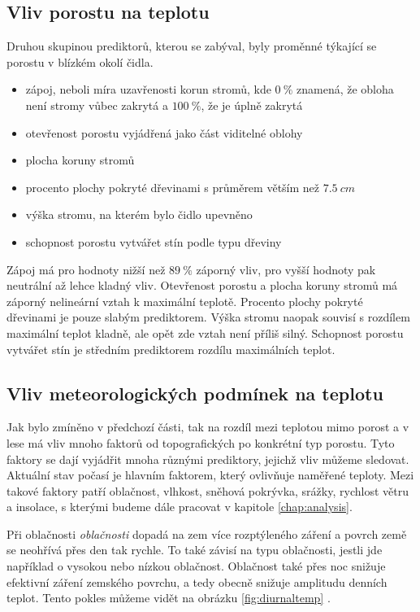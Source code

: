 \subsection{Vliv porostu na teplotu}
Druhou skupinou prediktorů, kterou se \parencite{ZellwegerFlorian2019Sdou} zabýval, byly proměnné týkající se porostu v blízkém okolí čidla.
\begin{itemize}
	\item zápoj, neboli míra uzavřenosti korun stromů, kde $\SI{0}{\%}$ znamená, že obloha není stromy vůbec zakrytá a $\SI{100}{\%}$, že je úplně zakrytá
	\item otevřenost porostu vyjádřená jako část viditelné oblohy
	\item plocha koruny stromů
	\item procento plochy pokryté dřevinami s průměrem větším než $\SI{7.5}{cm}$
	\item výška stromu, na kterém bylo čidlo upevněno
	\item schopnost porostu vytvářet stín podle typu dřeviny
\end{itemize}
Zápoj má pro hodnoty nižší než $\SI{89}{\%}$ záporný vliv, pro vyšší hodnoty pak neutrální až lehce kladný vliv. Otevřenost porostu a plocha koruny stromů má záporný nelineární vztah k maximální teplotě. Procento plochy pokryté dřevinami je pouze slabým prediktorem. Výška stromu naopak souvisí s rozdílem maximální teplot kladně, ale opět zde vztah není příliš silný. Schopnost porostu vytvářet stín je středním prediktorem rozdílu maximálních teplot.

\subsection{Vliv meteorologických podmínek na teplotu}\label{chap:vlivmeteo}
Jak bylo zmíněno v předchozí části, tak na rozdíl mezi teplotou mimo porost a v lese má vliv mnoho faktorů od topografických po konkrétní typ porostu. Tyto faktory se dají vyjádřit mnoha různými prediktory, jejichž vliv můžeme sledovat. Aktuální stav počasí je hlavním faktorem, který ovlivňuje naměřené teploty. Mezi takové faktory patří oblačnost, vlhkost, sněhová pokrývka, srážky, rychlost větru a insolace, s kterými budeme dále pracovat v kapitole \ref{chap:analysis}.

Při oblačnosti \textit{oblačnosti} dopadá na zem více rozptýleného záření a povrch země se neohřívá přes den tak rychle. To také závisí na typu oblačnosti, jestli jde například o vysokou nebo nízkou oblačnost. Oblačnost také přes noc snižuje efektivní záření zemského povrchu, a tedy obecně snižuje amplitudu denních teplot. Tento pokles můžeme vidět na obrázku \ref{fig:diurnaltemp} \parencite{arya2001}.

